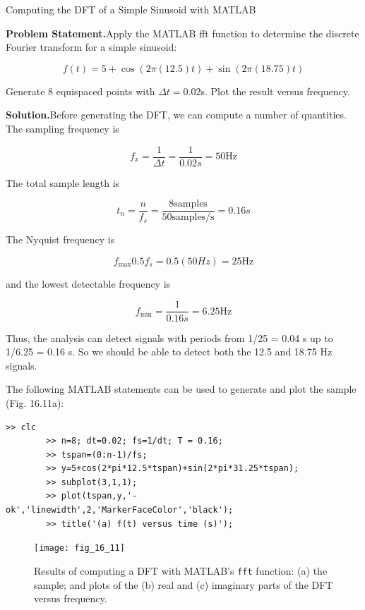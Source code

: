 \documentclass[../main.tex]{subfiles}
\begin{document}
\begin{example} Computing the DFT of a Simple Sinusoid with MATLAB

    \noindent\textbf{Problem Statement.}\quad Apply the MATLAB fft function to determine the discrete Fourier
	transform for a simple sinusoid:

	$$
		f(t) = 5 + \cos(2 \pi (12.5) t) + \sin(2 \pi (18.75) t)
	$$

	\noindent Generate 8 equispaced points with $\Delta t = 0.02 $s. Plot the result versus frequency.

    \noindent\textbf{Solution.}\quad  Before generating the DFT, we can compute a number of quantities. The sampling frequency is

	$$
		f_x = \frac{1}{\Delta t} = \frac{1}{0.02 s} = 50 \text{Hz}
	$$

	\noindent The total sample length is

	$$
		t_n = \frac{n}{f_s} = \frac{8 \text{samples}}{50 \text{samples/s}} = 0.16 s
	$$

	\noindent The Nyquist frequency is

	$$
		f_\text{max} 0.5 f_s = 0.5 (50Hz) = 25 \text{Hz}
	$$

	\noindent and the lowest detectable frequency is

	$$
		f_\text{min}	= \frac{1}{0.16 s} = 6.25 \text {Hz}
	$$

	\noindent Thus, the analysis can detect signals with periods from 1/25 = 0.04 s up to 1/6.25 = 0.16 s.
	So we should be able to detect both the 12.5 and 18.75 Hz signals.

	The following MATLAB statements can be used to generate and plot the sample
(Fig. 16.11a):

	\begin{lstlisting}[numbers=none]
		>> clc
		>> n=8; dt=0.02; fs=1/dt; T = 0.16;
		>> tspan=(0:n-1)/fs;
		>> y=5+cos(2*pi*12.5*tspan)+sin(2*pi*31.25*tspan);
		>> subplot(3,1,1);
		>> plot(tspan,y,'-ok','linewidth',2,'MarkerFaceColor','black');
		>> title('(a) f(t) versus time (s)');
	\end{lstlisting}

	\begin{figure}[H] 
		\centering
		\texttt{[image: fig\_16\_11]}
		\caption{\textsf{Results of computing a DFT with MATLAB's \texttt{fft} function: (a) the sample; and plots of
		the (b) real and (c) imaginary parts of the DFT versus frequency.}}
		\label{fig:fig_16_11}
	\end{figure}


\end{example}
\end{document}
